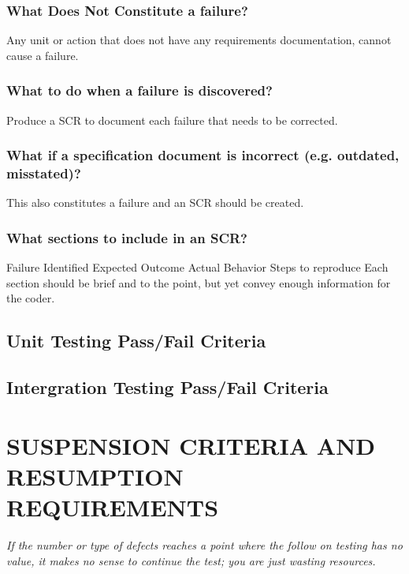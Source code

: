 {{\subsubsection{What Does Not Constitute a failure?}
Any unit or action that does not have any requirements documentation, cannot cause a failure.

\subsubsection{What to do when a failure is discovered?}
Produce a SCR to document each failure that needs to be corrected.

\subsubsection{What if a specification document is incorrect (e.g. outdated, misstated)?}
This also constitutes a failure and an SCR should be created.

\subsubsection{What sections to include in an SCR?}
Failure Identified 
\newline
Expected Outcome 
\newline
Actual Behavior 
\newline
Steps to reproduce
\newline
Each section should be brief and to the point, but yet convey enough information for the coder.

\subsection{Unit Testing Pass/Fail Criteria}

\subsection{Intergration Testing Pass/Fail Criteria}




}

\section[SUSPENSION CRITERIA]{\bfseries\color{black}
	 SUSPENSION CRITERIA AND RESUMPTION REQUIREMENTS}
{\itshape\color{black}
If the number or type of defects reaches a point where the follow on
testing has no value, it makes no sense to continue the test; you are
just wasting resources.

}}
